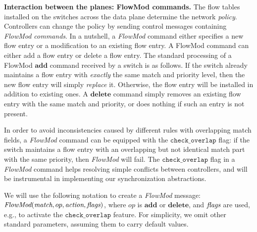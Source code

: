 \documentclass[conference]{sigcomm-alternate}
\newcommand{\add}{\textbf{add}\xspace}
\newcommand{\dele}{\textbf{delete}\xspace}
\newcommand{\FlowMod}{\emph{FlowMod}\xspace}
\newcommand{\match}{\emph{match}\xspace}
\newcommand{\action}{\emph{action}\xspace}
\newcommand{\flags}{\emph{flags}\xspace}
\newcommand{\checko}{\texttt{check\_overlap}\xspace}
\newcommand{\liron}[1]{\textit{\textcolor{mypurple}{[liron]: #1}}} %
\newcommand{\petr}[1]{\textit{\textcolor{blue}{[petr]: #1}}} %
\begin{document}
\vspace{1mm}
\noindent\textbf{Interaction between the planes: FlowMod commands.}
The flow tables installed on the switches across the data plane
determine the network \emph{policy}.
Controllers can change the policy by sending
control messages containing \emph{FlowMod commands}.
In a nutshell, a \emph{FlowMod} command either specifies a new flow entry or
a modification to an existing flow entry.
%
%
%
%
A FlowMod command can either add a flow entry or delete a flow entry.
The standard processing of a FlowMod $\add$ command received by a switch is
as follows.
If the switch already maintains a flow entry with \emph{exactly} the
same match and priority level, then the new flow entry will simply \emph{replace} it.
Otherwise, the flow entry will be installed in addition to existing
ones.
A $\dele$ command simply removes an existing flow entry with the same
match and priority,  or does nothing if such an entry is not present.



In order to avoid inconsistencies caused by different rules with
overlapping match fields, a \emph{FlowMod} command can be equipped with 
the $\checko$ flag:
if the switch maintains a flow entry with an overlapping but not
identical match part with the same priority, then
\emph{FlowMod} will fail.
The $\checko$ flag in a \emph{FlowMod} command helps resolving simple
conflicts between controllers, and will be instrumental
in implementing our synchronization abstractions.

We will use the following notation to create a \emph{FlowMod} message:
$\FlowMod(\match, op, \action, \flags)$, where
$op$ is $\add$ or $\dele$, and $\flags$ are used, e.g.,  to activate the $\checko$
feature.
For simplicity, we omit other standard parameters, assuming them to carry
default values.
\end{document}
